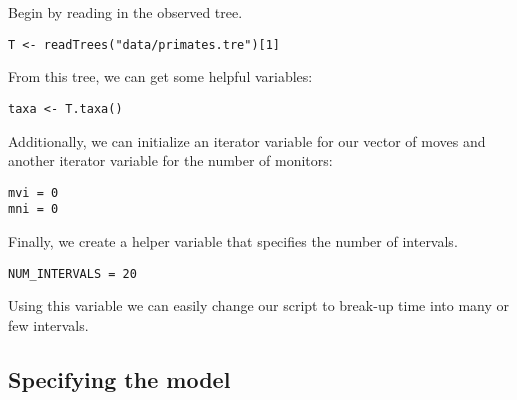Begin by reading in the observed tree. 

{\tt \begin{snugshade*}
\begin{lstlisting}
T <- readTrees("data/primates.tre")[1]
\end{lstlisting}
\end{snugshade*}}

From this tree, we can get some helpful variables:
{\tt \begin{snugshade*}
\begin{lstlisting}
taxa <- T.taxa()
\end{lstlisting}
\end{snugshade*}}

Additionally, we can initialize an iterator variable for our vector of moves and another iterator variable for the number of monitors:
{\tt \begin{snugshade*}
\begin{lstlisting}
mvi = 0
mni = 0
\end{lstlisting}
\end{snugshade*}}

Finally, we create a helper variable that specifies the number of intervals.
{\tt \begin{snugshade*}
\begin{lstlisting}
NUM_INTERVALS = 20
\end{lstlisting}
\end{snugshade*}}
Using this variable we can easily change our script to break-up time into many or few intervals.



\subsection{Specifying the model}

